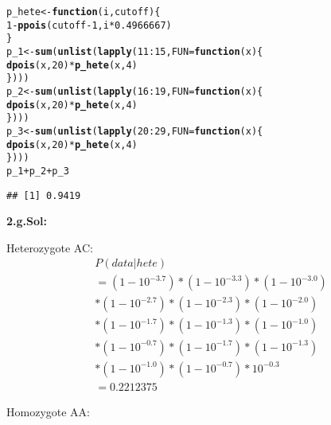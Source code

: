 \documentclass[a4paper,11pt]{article}\usepackage{graphicx, color}
\makeatletter
\newcommand{\hlfunctioncall}[1]{\textcolor[rgb]{0.501960784313725,0,0.329411764705882}{\textbf{#1}}}%
\newenvironment{kframe}{%
 \def\at@end@of@kframe{}%
 \ifinner\ifhmode%
  \def\at@end@of@kframe{\end{minipage}}%
  \begin{minipage}{\columnwidth}%
 \fi\fi%
 \def\FrameCommand##1{\hskip\@totalleftmargin \hskip-\fboxsep
 \colorbox{shadecolor}{##1}\hskip-\fboxsep
     \hskip-\linewidth \hskip-\@totalleftmargin \hskip\columnwidth}%
 \MakeFramed {\advance\hsize-\width
   \@totalleftmargin\z@ \linewidth\hsize
   \@setminipage}}%
 {\par\unskip\endMakeFramed%
 \at@end@of@kframe}
\newenvironment{knitrout}{}{} %
\makeatother
\begin{document}
\begin{knitrout}
\color{fgcolor}\begin{kframe}
\begin{alltt}
p_hete <- \hlfunctioncall{function}(i, cutoff) \{
    1 - \hlfunctioncall{ppois}(cutoff - 1, i * 0.4966667)
\}
p_1 <- \hlfunctioncall{sum}(\hlfunctioncall{unlist}(\hlfunctioncall{lapply}(11:15, FUN = \hlfunctioncall{function}(x) \{
    \hlfunctioncall{dpois}(x, 20) * \hlfunctioncall{p_hete}(x, 4)
\})))
p_2 <- \hlfunctioncall{sum}(\hlfunctioncall{unlist}(\hlfunctioncall{lapply}(16:19, FUN = \hlfunctioncall{function}(x) \{
    \hlfunctioncall{dpois}(x, 20) * \hlfunctioncall{p_hete}(x, 4)
\})))
p_3 <- \hlfunctioncall{sum}(\hlfunctioncall{unlist}(\hlfunctioncall{lapply}(20:29, FUN = \hlfunctioncall{function}(x) \{
    \hlfunctioncall{dpois}(x, 20) * \hlfunctioncall{p_hete}(x, 4)
\})))
p_1 + p_2 + p_3
\end{alltt}
\begin{verbatim}
## [1] 0.9419
\end{verbatim}
\end{kframe}
\end{knitrout}


\textbf{2.g.Sol:}

Heterozygote AC:
\begin{align}
	& P(data|hete) \\
	&= (1-10^{-3.7})*(1-10^{-3.3})*(1-10^{-3.0}) \\
	& *(1-10^{-2.7})*(1-10^{-2.3})*(1-10^{-2.0}) \\
	& *(1-10^{-1.7})*(1-10^{-1.3})*(1-10^{-1.0}) \\ 
	& *(1-10^{-0.7})* (1-10^{-1.7}) *(1-10^{-1.3}) \\
	& * (1-10^{-1.0}) * (1- 10^{-0.7}) * 10^{-0.3} \\ 
	&= 0.2212375
\end{align}

Homozygote AA: 
\end{document}
